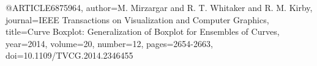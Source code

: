 @ARTICLE{6875964,
  author={M. {Mirzargar} and R. T. {Whitaker} and R. M. {Kirby}},
  journal={IEEE Transactions on Visualization and Computer Graphics}, 
  title={Curve Boxplot: Generalization of Boxplot for Ensembles of Curves}, 
  year={2014},
  volume={20},
  number={12},
  pages={2654-2663},
  doi={10.1109/TVCG.2014.2346455}}